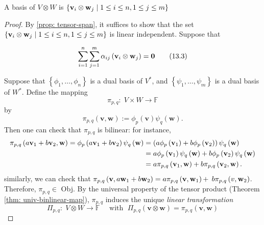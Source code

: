 \begin{theorem} \label{thm:tensorbasis}
    A basis of \(V \otimes  W\) is \(\left\{  {{\bf v}_{i} \otimes  {\bf w}_{j} \mid  1 \leq  i \leq  n,1 \leq  j \leq  m}\right\}\)
\end{theorem} 

\begin{proof}
By \autoref{prop: tensor-span}, it suffices to show that the set \(\left\{  {{\bf v}_{i} \otimes  {\bf w}_{j} \mid  1 \leq  i \leq  n,1 \leq  j \leq  m}\right\}\) is linear independent. Suppose that

\begin{equation}\label{eq: tensor-linear-independece}
    \mathop{\sum }\limits_{{i = 1}}^n\mathop{\sum }\limits_{{j = 1}}^m\alpha_{ij}\left( {{\bf v}_{i} \otimes  {\bf w}_{j}}\right)  = \mathbf{0} \tag{13.3}
\end{equation}


Suppose that \(\left\{  {{\phi }_1,\ldots ,{\phi }_n}\right\}\) is a dual basis of \({V}^{ * }\), and \(\left\{  {{\psi }_1,\ldots ,{\psi }_{m}}\right\}\) is a dual basis of \({W}^{ * }\). Define the mapping
\[
{\pi }_{p,q} : \;V \times  W \rightarrow  \mathbb{F}
\]
by 
$$\pi_{p,q}(\mathbf{v},\mathbf{w}) := {\phi }_{p}\left( \mathbf{v}\right) {\psi }_{q}\left( \mathbf{w}\right).$$
Then one can check that \({\pi }_{p,q}\) is bilinear: for instance,
\begin{align*}
{\pi }_{p,q}\left( {a{\bf v}_1 + b{\bf v}_2,\mathbf{w}}\right)  = {\phi }_{p}\left( {a{\bf v}_1 + b{\bf v}_2}\right) {\psi }_{q}\left( \mathbf{w}\right)
&= \left( {a{\phi }_{p}\left( {\bf v}_1\right)  + b{\phi }_{p}\left( {\bf v}_2\right) }\right) {\psi }_{q}\left( \mathbf{w}\right)\\
&= a{\phi }_{p}\left( {\bf v}_1\right) {\psi }_{q}\left( \mathbf{w}\right)  + b{\phi }_{p}\left( {\bf v}_2\right) {\psi }_{q}\left( \mathbf{w}\right)\\
&= a{\pi }_{p,q}\left( {{\bf v}_1,\mathbf{w}}\right)  + b{\pi }_{p,q}\left( {{\bf v}_2,\mathbf{w}}\right) .
\end{align*}
similarly, we can check that \({\pi }_{p,q}\left( {\mathbf{v},a{\bf w}_1 + b{\bf w}_2}\right)  = a{\pi }_{p,q}\left( {\mathbf{v},{\bf w}_1}\right)  +\)  \(b{\pi }_{p,q}\left( {v,{\bf w}_2}\right)\). Therefore, \({\pi }_{p,q} \in\) Obj. By the universal property of the tensor product (Theorem \ref{thm: univ-binlinear-map}), \({\pi }_{p,q}\) induces the unique {\it linear transformation}
\[
\Pi_{p,q} : \;V \otimes  W \rightarrow  \mathbb{F}
\quad \text{ with }\;\Pi_{p,q}\left( {\mathbf{v} \otimes  \mathbf{w}}\right)  = {\pi }_{p,q}\left( {\mathbf{v},\mathbf{w}}\right)
\]


\end{proof}
